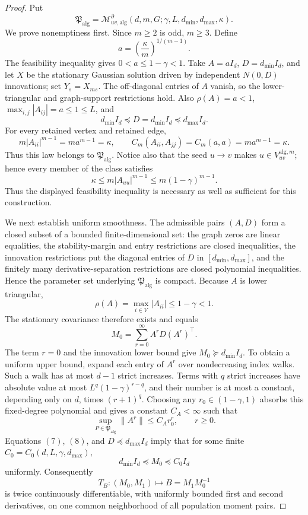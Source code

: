 \documentclass{article}
\begin{document}
\begin{proof}
Put
\[
 \mathfrak P_{\mathrm{alg}}
 =\mathcal M_{uv,\mathrm{alg}}^{\partial}
 (d,m,G;\gamma,L,d_{\min},d_{\max},\kappa).
\tag{1}
\]
We prove nonemptiness first.  Since \(m\ge2\) is odd, \(m\ge3\).  Define
\[
 a=\left(\frac{\kappa}{m}\right)^{1/(m-1)}.
\tag{2}
\]
The feasibility inequality gives \(0<a\le1-\gamma<1\).  Take \(A=aI_d\), \(D=d_{\min}I_d\), and let \(X\) be the stationary Gaussian solution driven by independent \(N(0,D)\) innovations; set \(Y_s=X_{ms}\).  The off-diagonal entries of \(A\) vanish, so the lower-triangular and graph-support restrictions hold.  Also \(\rho(A)=a<1\), \(\max_{i,j}|A_{ij}|=a\le1\le L\), and
\[
 d_{\min}I_d\preceq D=d_{\min}I_d\preceq d_{\max}I_d.
\tag{3}
\]
For every retained vertex and retained edge,
\[
 m|A_{ii}|^{m-1}=ma^{m-1}=\kappa,
 \qquad
 C_m(A_{ii},A_{jj})=C_m(a,a)=ma^{m-1}=\kappa.
\tag{4}
\]
Thus this law belongs to \(\mathfrak P_{\mathrm{alg}}\).  Notice also that the seed \(u\to v\) makes \(u\in V_{uv}^{\mathrm{alg},m}\); hence every member of the class satisfies
\[
 \kappa\le m|A_{uu}|^{m-1}\le m(1-\gamma)^{m-1}.
\tag{5}
\]
Thus the displayed feasibility inequality is necessary as well as sufficient for this construction.

We next establish uniform smoothness.  The admissible pairs \((A,D)\) form a closed subset of a bounded finite-dimensional set: the graph zeros are linear equalities, the stability-margin and entry restrictions are closed inequalities, the innovation restrictions put the diagonal entries of \(D\) in \([d_{\min},d_{\max}]\), and the finitely many derivative-separation restrictions are closed polynomial inequalities.  Hence the parameter set underlying \(\mathfrak P_{\mathrm{alg}}\) is compact.  Because \(A\) is lower triangular,
\[
 \rho(A)=\max_{i\in V}|A_{ii}|\le1-\gamma<1.
\tag{6}
\]
The stationary covariance therefore exists and equals
\[
 M_0=\sum_{r=0}^{\infty}A^rD(A^r)^\top.
\tag{7}
\]
The term \(r=0\) and the innovation lower bound give \(M_0\succeq d_{\min}I_d\).  To obtain a uniform upper bound, expand each entry of \(A^r\) over nondecreasing index walks.  Such a walk has at most \(d-1\) strict increases.  Terms with \(q\) strict increases have absolute value at most \(L^q(1-\gamma)^{r-q}\), and their number is at most a constant, depending only on \(d\), times \((r+1)^q\).  Choosing any \(r_0\in(1-\gamma,1)\) absorbs this fixed-degree polynomial and gives a constant \(C_A<\infty\) such that
\[
 \sup_{P\in\mathfrak P_{\mathrm{alg}}}\|A^r\|
 \le C_A r_0^r,
 \qquad r\ge0.
\tag{8}
\]
Equations \((7)\), \((8)\), and \(D\preceq d_{\max}I_d\) imply that for some finite \(C_0=C_0(d,L,\gamma,d_{\max})\),
\[
 d_{\min}I_d\preceq M_0\preceq C_0I_d
\tag{9}
\]
uniformly.  Consequently
\[
 T_B:(M_0,M_1)\longmapsto B=M_1M_0^{-1}
\tag{10}
\]
is twice continuously differentiable, with uniformly bounded first and second derivatives, on one common neighborhood of all population moment pairs.


\end{proof}
\end{document}
